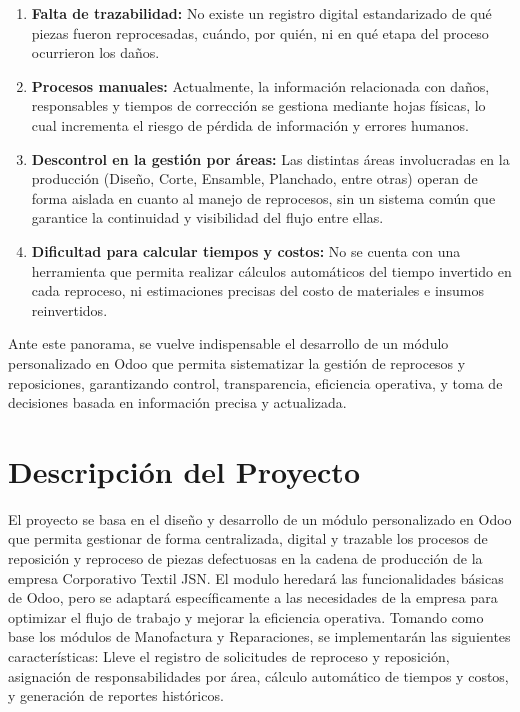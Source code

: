 \documentclass[12pt,letterpaper,spanish]{report}
\begin{document}
\begin{enumerate}
    \item \textbf{Falta de trazabilidad:} No existe un registro digital estandarizado de qué piezas fueron reprocesadas, cuándo, por quién, ni en qué etapa del proceso ocurrieron los daños.
    
    \item \textbf{Procesos manuales:} Actualmente, la información relacionada con daños, responsables y tiempos de corrección se gestiona mediante hojas físicas, lo cual incrementa el riesgo de pérdida de información y errores humanos.
    
    \item \textbf{Descontrol en la gestión por áreas:} Las distintas áreas involucradas en la producción (Diseño, Corte, Ensamble, Planchado, entre otras) operan de forma aislada en cuanto al manejo de reprocesos, sin un sistema común que garantice la continuidad y visibilidad del flujo entre ellas.
    
    \item \textbf{Dificultad para calcular tiempos y costos:} No se cuenta con una herramienta que permita realizar cálculos automáticos del tiempo invertido en cada reproceso, ni estimaciones precisas del costo de materiales e insumos reinvertidos.

\end{enumerate}

Ante este panorama, se vuelve indispensable el desarrollo de un módulo personalizado en Odoo que permita sistematizar la gestión de reprocesos y reposiciones, garantizando control, transparencia, eficiencia operativa, y toma de decisiones basada en información precisa y actualizada.



\section{Descripción del Proyecto}

El proyecto se basa en el diseño y desarrollo de un módulo personalizado en Odoo que permita gestionar de forma centralizada, digital y trazable los procesos de reposición y reproceso de piezas defectuosas en la cadena de producción de la empresa Corporativo Textil JSN. El modulo heredará las funcionalidades básicas de Odoo, pero se adaptará específicamente a las necesidades de la empresa para optimizar el flujo de trabajo y mejorar la eficiencia operativa. Tomando como base los módulos de Manofactura y Reparaciones, se implementarán las siguientes características: Lleve el registro de solicitudes de reproceso y reposición, asignación de responsabilidades por área, cálculo automático de tiempos y costos, y generación de reportes históricos.
\end{document}
